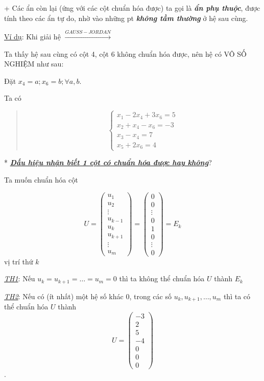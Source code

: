 \documentclass[12pt,a4paper]{article}
\let\ul\uline
\begin{document}
+ Các ẩn còn lại (ứng với các cột chuẩn hóa được) ta gọi là
\emph{\textbf{ẩn phụ thuộc}}, được tính theo các ẩn tự do, nhờ vào những
pt \emph{\textbf{không tầm thường}} ở hệ sau cùng.

\ul{Ví dụ}: Khi giải hệ $\xrightarrow{GAUSS-JORDAN}$

Ta thấy hệ sau cùng có cột 4, cột 6 không chuẩn hóa được, nên hệ có VÔ
SỐ NGHIỆM như sau:

Đặt $x_4 = a; x_6 = b; \forall a,b$.

Ta có

\begin{quote}
$$\begin{cases} x_1 - 2x_4 + 3x_6 = 5 \\ x_2 + x_4 - x_6 = -3 \\ x_3 - x_4 = 7 \\ x_5 + 2x_6 = 4 \end{cases}$$
\end{quote}

* \emph{\textbf{\ul{Dấu hiệu nhận biết 1 cột có chuẩn hóa được hay
không}}}?

Ta muốn chuẩn hóa cột

$$U = \begin{pmatrix} u_1 \\ u_2 \\ \vdots \\ u_{k-1} \\ u_k \\ u_{k+1} \\ \vdots \\ u_m \end{pmatrix} = \begin{pmatrix} 0 \\ 0 \\ \vdots \\ 0 \\ 1 \\ 0 \\ \vdots \\ 0 \end{pmatrix} = E_k$$ vị trí thứ
$k$

\emph{\ul{TH1}}: Nếu $u_k = u_{k+1} = \dots = u_m = 0$ thì ta không
thể chuẩn hóa $U$ thành
$E_k$

\emph{\ul{TH2}}: Nếu có (ít nhất) một hệ số khác 0, trong các số
$u_k, u_{k+1}, \dots, u_m$ thì ta có thể chuẩn hóa
$U$ thành
$$U = \begin{pmatrix} -3 \\ 2 \\ 5 \\ -4 \\ 0 \\ 0 \\ 0 \end{pmatrix}$$.
\end{document}
